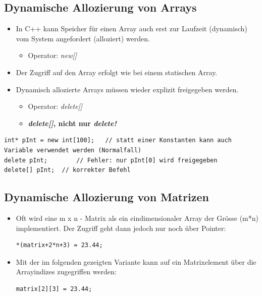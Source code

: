 \subsection{Dynamische Allozierung von Arrays}
\begin{itemize}
	\item In C++ kann Speicher für einen Array auch erst zur Laufzeit (dynamisch) vom System angefordert (alloziert) werden.
	\begin{itemize}
		\item Operator: \emph{new[]}
	\end{itemize}
	\item Der Zugriff auf den Array erfolgt wie bei einem statischen Array.
	\item Dynamisch allozierte Arrays müssen wieder explizit freigegeben werden.
	\begin{itemize}
		\item Operator: \emph{delete[]}
		\item \textbf{\emph{delete[]}, nicht nur \emph{delete!}}
	\end{itemize}
\end{itemize}
\vspace{-\baselineskip}
\begin{minipage}{\linewidth}
\begin{lstlisting}
int* pInt = new int[100];	// statt einer Konstanten kann auch Variable verwendet werden (Normalfall)
delete pInt;		// Fehler: nur pInt[0] wird freigegeben
delete[] pInt;	// korrekter Befehl
\end{lstlisting}
\end{minipage} 

\subsection{Dynamische Allozierung von Matrizen}
\begin{itemize}
	\item Oft wird eine m x n - Matrix als ein eindimensionaler Array der Grösse (m*n) implementiert. Der Zugriff geht dann jedoch nur noch über Pointer:\\
	\begin{minipage}{0.35\linewidth}
\vspace{-\baselineskip}
\begin{lstlisting}
*(matrix+2*n+3) = 23.44;
\end{lstlisting}
	\end{minipage}
	\item Mit der im folgenden gezeigten Variante kann auf ein Matrixelement über die Arrayindizes zugegriffen werden:\\
	\begin{minipage}{0.35\linewidth}
	\vspace{-\baselineskip}
\begin{lstlisting}
matrix[2][3] = 23.44;
\end{lstlisting}
	\end{minipage}
\end{itemize}

